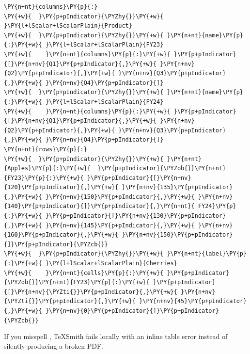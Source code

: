 \documentclass[a4paper,twoside]{article}
\begin{document}
\begin{tscode}[lang=yaml, engine=pygments]
\begin{Verbatim}[commandchars=\\\{\},breaklines, breakanywhere, commandchars=\\\{\}]
\PY{n+nt}{columns}\PY{p}{:}
\PY{+w}{  }\PY{p+pIndicator}{\PYZhy{}}\PY{+w}{ }\PY{l+lScalar+lScalarPlain}{Product}
\PY{+w}{  }\PY{p+pIndicator}{\PYZhy{}}\PY{+w}{ }\PY{n+nt}{name}\PY{p}{:}\PY{+w}{ }\PY{l+lScalar+lScalarPlain}{FY23}
\PY{+w}{    }\PY{n+nt}{columns}\PY{p}{:}\PY{+w}{ }\PY{p+pIndicator}{[}\PY{n+nv}{Q1}\PY{p+pIndicator}{,}\PY{+w}{ }\PY{n+nv}{Q2}\PY{p+pIndicator}{,}\PY{+w}{ }\PY{n+nv}{Q3}\PY{p+pIndicator}{,}\PY{+w}{ }\PY{n+nv}{Q4}\PY{p+pIndicator}{]}
\PY{+w}{  }\PY{p+pIndicator}{\PYZhy{}}\PY{+w}{ }\PY{n+nt}{name}\PY{p}{:}\PY{+w}{ }\PY{l+lScalar+lScalarPlain}{FY24}
\PY{+w}{    }\PY{n+nt}{columns}\PY{p}{:}\PY{+w}{ }\PY{p+pIndicator}{[}\PY{n+nv}{Q1}\PY{p+pIndicator}{,}\PY{+w}{ }\PY{n+nv}{Q2}\PY{p+pIndicator}{,}\PY{+w}{ }\PY{n+nv}{Q3}\PY{p+pIndicator}{,}\PY{+w}{ }\PY{n+nv}{Q4}\PY{p+pIndicator}{]}
\PY{n+nt}{rows}\PY{p}{:}
\PY{+w}{  }\PY{p+pIndicator}{\PYZhy{}}\PY{+w}{ }\PY{n+nt}{Apples}\PY{p}{:}\PY{+w}{  }\PY{p+pIndicator}{\PYZob{}}\PY{n+nt}{FY23}\PY{p}{:}\PY{+w}{ }\PY{p+pIndicator}{[}\PY{n+nv}{120}\PY{p+pIndicator}{,}\PY{+w}{ }\PY{n+nv}{135}\PY{p+pIndicator}{,}\PY{+w}{ }\PY{n+nv}{150}\PY{p+pIndicator}{,}\PY{+w}{ }\PY{n+nv}{140}\PY{p+pIndicator}{]}\PY{p+pIndicator}{,}\PY{n+nt}{ FY24}\PY{p}{:}\PY{+w}{ }\PY{p+pIndicator}{[}\PY{n+nv}{130}\PY{p+pIndicator}{,}\PY{+w}{ }\PY{n+nv}{145}\PY{p+pIndicator}{,}\PY{+w}{ }\PY{n+nv}{160}\PY{p+pIndicator}{,}\PY{+w}{ }\PY{n+nv}{150}\PY{p+pIndicator}{]}\PY{p+pIndicator}{\PYZcb{}}
\PY{+w}{  }\PY{p+pIndicator}{\PYZhy{}}\PY{+w}{ }\PY{n+nt}{label}\PY{p}{:}\PY{+w}{ }\PY{l+lScalar+lScalarPlain}{Cherries}
\PY{+w}{    }\PY{n+nt}{cells}\PY{p}{:}\PY{+w}{ }\PY{p+pIndicator}{\PYZob{}}\PY{n+nt}{FY23}\PY{p}{:}\PY{+w}{ }\PY{p+pIndicator}{[}\PY{n+nv}{\PYZti{}}\PY{p+pIndicator}{,}\PY{+w}{ }\PY{n+nv}{\PYZti{}}\PY{p+pIndicator}{,}\PY{+w}{ }\PY{n+nv}{45}\PY{p+pIndicator}{,}\PY{+w}{ }\PY{n+nv}{0}\PY{p+pIndicator}{]}\PY{p+pIndicator}{\PYZcb{}}
\end{Verbatim}
\end{tscode}
If you misspell , TeXSmith fails locally with an inline table error
instead of silently producing a broken PDF.
\end{document}
